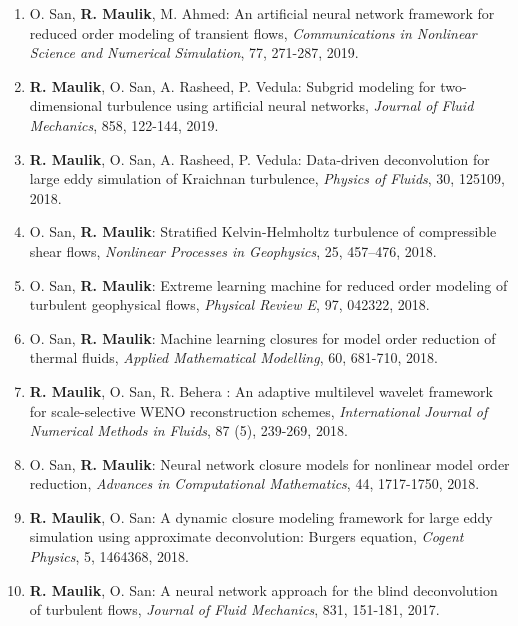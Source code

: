 \documentclass[letterpaper]{article}
\begin{document}
\begin{enumerate}
\item O. San, \textbf{R. Maulik}, M. Ahmed: An artificial neural network framework for reduced order modeling of transient flows, {\it Communications in Nonlinear Science and Numerical Simulation}, 77, 271-287, 2019. 

\item \textbf{R. Maulik}, O. San, A. Rasheed, P. Vedula: Subgrid modeling for two-dimensional turbulence using artificial neural networks, {\it Journal of Fluid Mechanics}, 858, 122-144, 2019. 

\item \textbf{R. Maulik}, O. San, A. Rasheed, P. Vedula: Data-driven deconvolution for large eddy simulation of Kraichnan turbulence, {\it Physics of Fluids}, 30, 125109, 2018. 

\item O. San, \textbf{R. Maulik}: Stratified Kelvin-Helmholtz turbulence of compressible shear flows, {\it Nonlinear Processes in Geophysics}, 25, 457--476, 2018.

\item O. San, \textbf{R. Maulik}: Extreme learning machine for reduced order modeling of turbulent geophysical flows, {\it Physical Review E}, 97, 042322, 2018. 

\item O. San, \textbf{R. Maulik}: Machine learning closures for model order reduction of thermal fluids,  {\it Applied Mathematical Modelling}, 60, 681-710, 2018. 

\item \textbf{R. Maulik}, O. San, R. Behera : An adaptive multilevel wavelet framework for scale-selective WENO reconstruction schemes, {\it International Journal of Numerical Methods in Fluids}, 87 (5), 239-269, 2018. 

\item O. San, \textbf{R. Maulik}: Neural network closure models for nonlinear model order reduction, {\it Advances in Computational Mathematics}, 44, 1717-1750, 2018. 

\item \textbf{R. Maulik}, O. San: A dynamic closure modeling framework for large eddy simulation using approximate deconvolution: Burgers equation, {\it Cogent Physics}, 5, 1464368, 2018. 

\item \textbf{R. Maulik}, O. San: A neural network approach for the blind deconvolution of turbulent flows, {\it Journal of Fluid Mechanics}, 831, 151-181, 2017. 


\end{enumerate}
\end{document}
